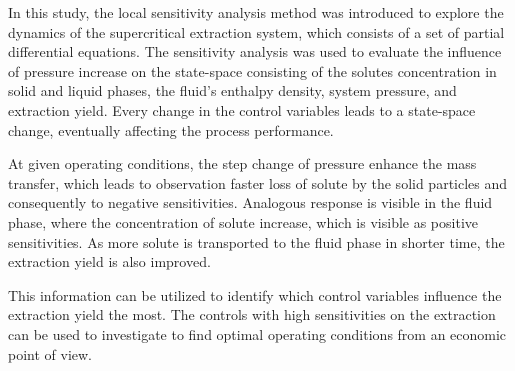 \documentclass[a4paper,fleqn]{cas-dc}
\begin{document}
In this study, the local sensitivity analysis method was introduced to explore the dynamics of the supercritical extraction system, which consists of a set of partial differential equations. The sensitivity analysis was used to evaluate the influence of pressure increase on the state-space consisting of the solutes concentration in solid and liquid phases, the fluid's enthalpy density, system pressure, and extraction yield. Every change in the control variables leads to a state-space change, eventually affecting the process performance. 

At given operating conditions, the step change of pressure enhance the mass transfer, which leads to observation faster loss of solute by the solid particles and consequently to negative sensitivities. Analogous response is visible in the fluid phase, where the concentration of solute increase, which is visible as positive sensitivities. As more solute is transported to the fluid phase in shorter time, the extraction yield is also improved.


This information can be utilized to identify which control variables influence the extraction yield the most. The controls with high sensitivities on the extraction can be used to investigate to find optimal operating conditions from an economic point of view.
\end{document}
